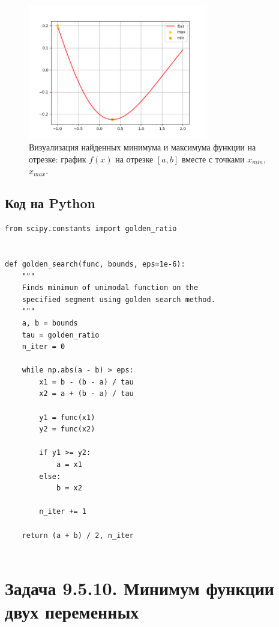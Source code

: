 \documentclass[12pt]{article}%
\begin{document}
\begin{figure}[!h]
    \centering
    \includegraphics[width=0.7\textwidth]{task2_opt.png}
    \caption{Визуализация найденных минимума и максимума функции на отрезке: график $f(x)$ на отрезке $[a, b]$ вместе с точками $x_{min}$, $x_{max}$.}
\end{figure}

\subsection{Код на Python}
\begin{verbatim}
from scipy.constants import golden_ratio


def golden_search(func, bounds, eps=1e-6):
    """
    Finds minimum of unimodal function on the 
    specified segment using golden search method.
    """
    a, b = bounds
    tau = golden_ratio
    n_iter = 0

    while np.abs(a - b) > eps:
        x1 = b - (b - a) / tau
        x2 = a + (b - a) / tau

        y1 = func(x1)
        y2 = func(x2)

        if y1 >= y2:
            a = x1
        else:
            b = x2

        n_iter += 1

    return (a + b) / 2, n_iter


\end{verbatim}



\newpage
\section{Задача 9.5.10. Минимум функции двух переменных}
\end{document}
